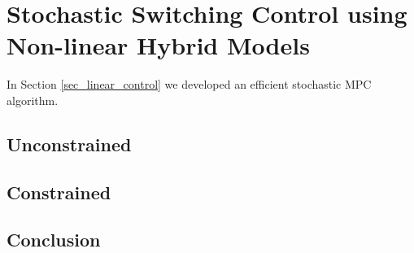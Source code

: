 \chapter{Stochastic Switching Control using Non-linear Hybrid Models}
\label{sec_spf_control}
In Section \ref{sec_linear_control} we developed an efficient stochastic MPC algorithm. 


\section{Unconstrained}

\section{Constrained} 

\section{Conclusion}
